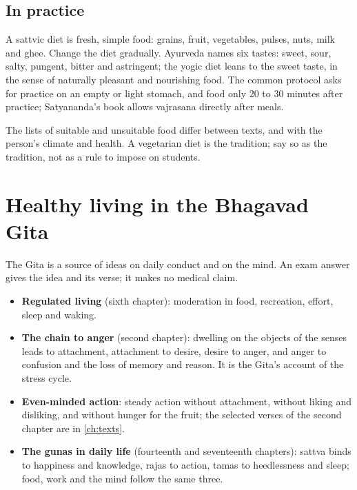 \subsection*{In practice}
A sattvic diet is fresh, simple food: grains, fruit, vegetables, pulses, nuts, milk and ghee. Change the diet gradually. Ayurveda names six tastes: sweet, sour, salty, pungent, bitter and astringent; the yogic diet leans to the sweet taste, in the sense of naturally pleasant and nourishing food. The common protocol asks for practice on an empty or light stomach, and food only 20 to 30 minutes after practice; Satyananda's book allows vajrasana directly after meals.

The lists of suitable and unsuitable food differ between texts, and with the person's climate and health. A vegetarian diet is the tradition; say so as the tradition, not as a rule to impose on students.

\section{Healthy living in the Bhagavad Gita}

The Gita is a source of ideas on daily conduct and on the mind. An exam answer gives the idea and its verse; it makes no medical claim.
\begin{itemize}
\item \textbf{Regulated living} (sixth chapter): moderation in food, recreation, effort, sleep and waking.
\item \textbf{The chain to anger} (second chapter): dwelling on the objects of the senses leads to attachment, attachment to desire, desire to anger, and anger to confusion and the loss of memory and reason. It is the Gita's account of the stress cycle.
\item \textbf{Even-minded action}: steady action without attachment, without liking and disliking, and without hunger for the fruit; the selected verses of the second chapter are in \cref{ch:texts}.
\item \textbf{The gunas in daily life} (fourteenth and seventeenth chapters): sattva binds to happiness and knowledge, rajas to action, tamas to heedlessness and sleep; food, work and the mind follow the same three.
\end{itemize}


